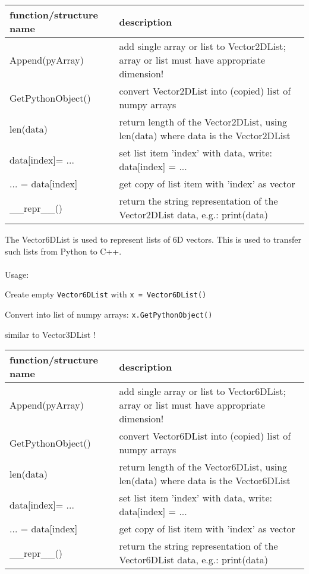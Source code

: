 \begin{center}
\footnotesize
\begin{longtable}{| p{8cm} | p{8cm} |} 
\hline
{\bf function/structure name} & {\bf description}\\ \hline
  Append(pyArray) & add single array or list to Vector2DList; array or list must have appropriate dimension!\\ \hline 
  GetPythonObject() & convert Vector2DList into (copied) list of numpy arrays\\ \hline 
  len(data) & return length of the Vector2DList, using len(data) where data is the Vector2DList\\ \hline 
  data[index]= ... & set list item 'index' with data, write: data[index] = ...\\ \hline 
  ... = data[index] & get copy of list item with 'index' as vector\\ \hline 
  \_\_repr\_\_() & return the string representation of the Vector2DList data, e.g.: print(data)\\ \hline 
\end{longtable}
\end{center}

The Vector6DList is used to represent lists of 6D vectors. This is used to transfer such lists from Python to C++. \\ \\ Usage: \bi
  \item Create empty \texttt{Vector6DList} with \texttt{x = Vector6DList()} 
  \item Convert into list of numpy arrays: \texttt{x.GetPythonObject()}
  \item similar to Vector3DList !
\ei


\begin{center}
\footnotesize
\begin{longtable}{| p{8cm} | p{8cm} |} 
\hline
{\bf function/structure name} & {\bf description}\\ \hline
  Append(pyArray) & add single array or list to Vector6DList; array or list must have appropriate dimension!\\ \hline 
  GetPythonObject() & convert Vector6DList into (copied) list of numpy arrays\\ \hline 
  len(data) & return length of the Vector6DList, using len(data) where data is the Vector6DList\\ \hline 
  data[index]= ... & set list item 'index' with data, write: data[index] = ...\\ \hline 
  ... = data[index] & get copy of list item with 'index' as vector\\ \hline 
  \_\_repr\_\_() & return the string representation of the Vector6DList data, e.g.: print(data)\\ \hline 
\end{longtable}
\end{center}

